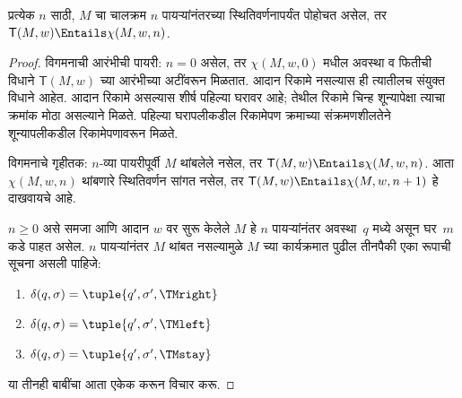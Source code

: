 \begin{lem}
\label{tur:und:ver:lem:config}
प्रत्येक $n$ साठी,
$M$ चा चालक्रम $n$ पायऱ्यांनंतरच्या
स्थितिवर्णनापर्यंत पोहोचत असेल, तर
$\mathsf{T}(M, w)
\Entails \chi(M, w, n)$.
\end{lem}


\begin{proof}
विगमनाची आरंभीची पायरी:
$n = 0$ असेल, तर
$\chi(M, w, 0)$ मधील अवस्था व फितीची विधाने
$\mathsf{T}(M, w)$ च्या आरंभीच्या अटींवरून मिळतात.
आदान रिकामे नसल्यास ही त्यातीलच संयुक्त विधाने आहेत.
आदान रिकामे असल्यास शीर्ष पहिल्या घरावर आहे;
तेथील रिकामे चिन्ह शून्यापेक्षा त्याचा क्रमांक मोठा
असल्याने मिळते. पहिल्या घरापलीकडील रिकामेपण
क्रमाच्या संक्रमणशीलतेने शून्यापलीकडील
रिकामेपणावरून मिळते.

विगमनाचे गृहीतक:
$n$-व्या पायरीपूर्वी $M$
थांबलेले नसेल, तर
$\mathsf{T}(M,w) \Entails \chi(M, w, n)$.
आता $\chi(M, w, n)$
थांबणारे स्थितिवर्णन सांगत
नसेल, तर $\mathsf{T}(M, w) \Entails
\chi(M, w, n+1)$ हे
दाखवायचे आहे.

$n \ge 0$ असे समजा
आणि आदान $w$ वर
सुरू केलेले $M$ हे
$n$ पायऱ्यांनंतर
अवस्था~$q$ मध्ये असून
घर~$m$ कडे पाहत
असेल. $n$ पायऱ्यांनंतर
$M$ थांबत नसल्यामुळे
$M$ च्या कार्यक्रमात
पुढील तीनपैकी एका
रूपाची सूचना असली पाहिजे:

\begin{enumerate}
\item \label{tur:und:ver:right} $\delta(q, \sigma) = \tuple{q', \sigma', \TMright}$

\item \label{tur:und:ver:left} $\delta(q, \sigma) = \tuple{q', \sigma', \TMleft}$

\item \label{tur:und:ver:stay} $\delta(q, \sigma) = \tuple{q', \sigma', \TMstay}$
\end{enumerate}

या तीनही बाबींचा आता
एकेक करून विचार करू.


\end{proof}
